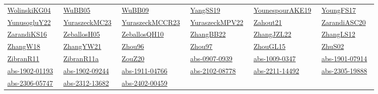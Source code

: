 \begin{longtable}{*{6}{l}}
\href{works/WolinskiKG04.pdf}{WolinskiKG04}~\cite{WolinskiKG04} & \href{works/WuBB05.pdf}{WuBB05}~\cite{WuBB05} & \href{works/WuBB09.pdf}{WuBB09}~\cite{WuBB09} & \href{works/YangSS19.pdf}{YangSS19}~\cite{YangSS19} & \href{works/YounespourAKE19.pdf}{YounespourAKE19}~\cite{YounespourAKE19} & \href{works/YoungFS17.pdf}{YoungFS17}~\cite{YoungFS17}\\ 
\href{works/YunusogluY22.pdf}{YunusogluY22}~\cite{YunusogluY22} & \href{works/YuraszeckMC23.pdf}{YuraszeckMC23}~\cite{YuraszeckMC23} & \href{works/YuraszeckMCCR23.pdf}{YuraszeckMCCR23}~\cite{YuraszeckMCCR23} & \href{works/YuraszeckMPV22.pdf}{YuraszeckMPV22}~\cite{YuraszeckMPV22} & \href{works/Zahout21.pdf}{Zahout21}~\cite{Zahout21} & \href{works/ZarandiASC20.pdf}{ZarandiASC20}~\cite{ZarandiASC20}\\ 
\href{works/ZarandiKS16.pdf}{ZarandiKS16}~\cite{ZarandiKS16} & \href{works/ZeballosH05.pdf}{ZeballosH05}~\cite{ZeballosH05} & \href{works/ZeballosQH10.pdf}{ZeballosQH10}~\cite{ZeballosQH10} & \href{works/ZhangBB22.pdf}{ZhangBB22}~\cite{ZhangBB22} & \href{works/ZhangJZL22.pdf}{ZhangJZL22}~\cite{ZhangJZL22} & \href{works/ZhangLS12.pdf}{ZhangLS12}~\cite{ZhangLS12}\\ 
\href{works/ZhangW18.pdf}{ZhangW18}~\cite{ZhangW18} & \href{works/ZhangYW21.pdf}{ZhangYW21}~\cite{ZhangYW21} & \href{works/Zhou96.pdf}{Zhou96}~\cite{Zhou96} & \href{works/Zhou97.pdf}{Zhou97}~\cite{Zhou97} & \href{works/ZhouGL15.pdf}{ZhouGL15}~\cite{ZhouGL15} & \href{works/ZhuS02.pdf}{ZhuS02}~\cite{ZhuS02}\\ 
\href{works/ZibranR11.pdf}{ZibranR11}~\cite{ZibranR11} & \href{works/ZibranR11a.pdf}{ZibranR11a}~\cite{ZibranR11a} & \href{works/ZouZ20.pdf}{ZouZ20}~\cite{ZouZ20} & \href{works/abs-0907-0939.pdf}{abs-0907-0939}~\cite{abs-0907-0939} & \href{works/abs-1009-0347.pdf}{abs-1009-0347}~\cite{abs-1009-0347} & \href{works/abs-1901-07914.pdf}{abs-1901-07914}~\cite{abs-1901-07914}\\ 
\href{works/abs-1902-01193.pdf}{abs-1902-01193}~\cite{abs-1902-01193} & \href{works/abs-1902-09244.pdf}{abs-1902-09244}~\cite{abs-1902-09244} & \href{works/abs-1911-04766.pdf}{abs-1911-04766}~\cite{abs-1911-04766} & \href{works/abs-2102-08778.pdf}{abs-2102-08778}~\cite{abs-2102-08778} & \href{works/abs-2211-14492.pdf}{abs-2211-14492}~\cite{abs-2211-14492} & \href{works/abs-2305-19888.pdf}{abs-2305-19888}~\cite{abs-2305-19888}\\ 
\href{works/abs-2306-05747.pdf}{abs-2306-05747}~\cite{abs-2306-05747} & \href{works/abs-2312-13682.pdf}{abs-2312-13682}~\cite{abs-2312-13682} & \href{works/abs-2402-00459.pdf}{abs-2402-00459}~\cite{abs-2402-00459} & \end{longtable}
